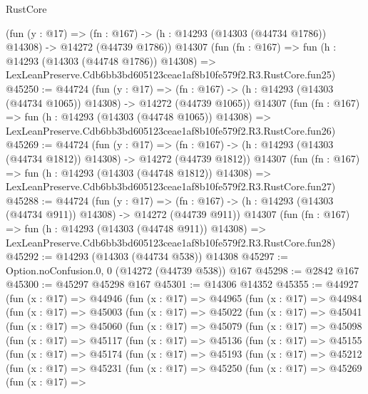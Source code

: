 \begin{lexlean}{RustCore}
\begin{coremodule}
    (fun (y : @17) =>
    (fn : @167) -> (h : @14293 (@14303 (@44734 @1786)) @14308) -> @14272 (@44739 @1786))
    @14307
    (fun (fn : @167) =>
    fun (h : @14293 (@14303 (@44748 @1786)) @14308) =>
    LexLeanPreserve.Cdb6bb3bd605123ceae1af8b10fe579f2.R3.RustCore.fun25)
@45250 := @44724
    (fun (y : @17) =>
    (fn : @167) -> (h : @14293 (@14303 (@44734 @1065)) @14308) -> @14272 (@44739 @1065))
    @14307
    (fun (fn : @167) =>
    fun (h : @14293 (@14303 (@44748 @1065)) @14308) =>
    LexLeanPreserve.Cdb6bb3bd605123ceae1af8b10fe579f2.R3.RustCore.fun26)
@45269 := @44724
    (fun (y : @17) =>
    (fn : @167) -> (h : @14293 (@14303 (@44734 @1812)) @14308) -> @14272 (@44739 @1812))
    @14307
    (fun (fn : @167) =>
    fun (h : @14293 (@14303 (@44748 @1812)) @14308) =>
    LexLeanPreserve.Cdb6bb3bd605123ceae1af8b10fe579f2.R3.RustCore.fun27)
@45288 := @44724
    (fun (y : @17) =>
    (fn : @167) -> (h : @14293 (@14303 (@44734 @911)) @14308) -> @14272 (@44739 @911))
    @14307
    (fun (fn : @167) =>
    fun (h : @14293 (@14303 (@44748 @911)) @14308) =>
    LexLeanPreserve.Cdb6bb3bd605123ceae1af8b10fe579f2.R3.RustCore.fun28)
@45292 := @14293 (@14303 (@44734 @538)) @14308
@45297 := Option.noConfusion.{0, 0} (@14272 (@44739 @538)) @167
@45298 := @2842 @167
@45300 := @45297 @45298 @167
@45301 := @14306 @14352
@45355 := @44927
    (fun (x : @17) =>
    @44946
      (fun (x : @17) =>
      @44965
        (fun (x : @17) =>
        @44984
          (fun (x : @17) =>
          @45003
            (fun (x : @17) =>
            @45022
              (fun (x : @17) =>
              @45041
                (fun (x : @17) =>
                @45060
                  (fun (x : @17) =>
                  @45079
                    (fun (x : @17) =>
                    @45098
                      (fun (x : @17) =>
                      @45117
                        (fun (x : @17) =>
                        @45136
                          (fun (x : @17) =>
                          @45155
                            (fun (x : @17) =>
                            @45174
                              (fun (x : @17) =>
                              @45193
                                (fun (x : @17) =>
                                @45212
                                  (fun (x : @17) =>
                                  @45231
                                    (fun (x : @17) =>
                                    @45250
                                      (fun (x : @17) =>
                                      @45269
                                        (fun (x : @17) =>

\end{coremodule}
\end{lexlean}

